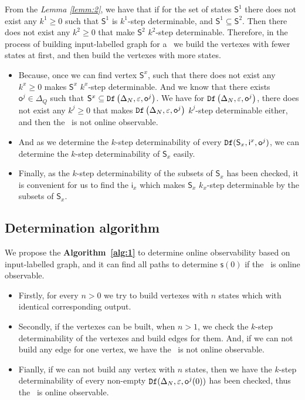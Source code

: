 From the {\em Lemma \ref{lemm:2}}, we have that if for the set of states $\mathsf{S}^1$ there does not exist any $k^{1}\ge 0$ such that $\mathsf{S}^{1}$ is $k^{1}$-step determinable, and $\mathsf{S}^{1}\subseteq \mathsf{S}^{2}$. Then there does not exist any $k^{2}\ge 0$ that make $\mathsf{S}^{2}$ $k^{2}$-step determinable. Therefore, in the process of building input-labelled graph for a \BCN\ we build the vertexes with fewer states at first, and then build the vertexes with more states.
\begin{itemize}
\item  Because, once we can find vertex $\mathsf{S}^x$, such that there does not exist any $k^{x}\ge0$ makes $\mathsf{S}^{x}$ $k^{x}$-step determinable. And we know that there exists $\mathsf{o}^{j}\in \Delta_Q$ such that $\mathsf{S}^{x}\subseteq {\tt Df}\left(\Delta_N,\varepsilon, \mathsf{o}^{j}\right)$. We have for ${\tt Df}\left(\Delta_N,\varepsilon, \mathsf{o}^{j}\right)$, there does not exist any $k^{j}\ge 0$ that makes  ${\tt Df}\left(\Delta_N,\varepsilon, \mathsf{o}^{j}\right)$ $k^{j}$-step determinable either, and then the \BCN\ is not online observable.
\item And as we determine the $k$-step determinability of every ${\tt Df}(\mathsf{S}_x,\mathsf{i}^{x},\mathsf{o}^{j})$, we can determine the $k$-step determinability of $\mathsf{S}_x$ easily.
\item  Finally, as the $k$-step determinability of the subsets of $\mathsf{S}_x$ has been checked, it is convenient for us to find the $\mathsf{i}_x$ which makes $\mathsf{S}_x$ $k_x$-step determinable by the subsets of $\mathsf{S}_x$.
 \end{itemize}
 \subsection{Determination algorithm}
 We propose the {\bf Algorithm~\ref{alg:1}} to determine online observability based on input-labelled graph, and it can find all paths to determine $\mathsf{s}(0)$ if the \BCN\ is online observable.

\begin{itemize}
\item  Firstly, for every $n>0$ we try to build vertexes with $n$ states which with identical corresponding output. 
\item Secondly, if the vertexes can  be built, when $n>1$, we check the $k$-step determinability of the vertexes and build edges for them. And, if we can not build any edge for one vertex, we have the \BCN\ is not online observable.
\item Fianlly, if we can not build any vertex with $n$ states, then we have the $k$-step determinability of every non-empty ${\tt Df}(\Delta_N,\varepsilon, \mathsf{o}^{j}(0))$ has been checked,  thus the \BCN\ is online observable.
 \end{itemize}


